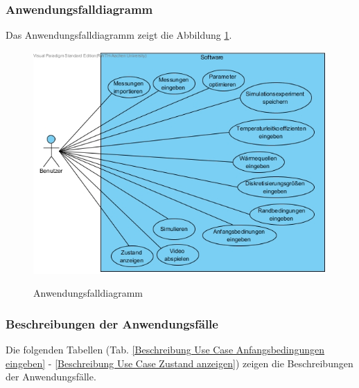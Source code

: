 \subsubsection{Anwendungsfalldiagramm}
Das Anwendungsfalldiagramm zeigt die Abbildung \ref{Use Case Diagramm}.
\begin{figure}[H]
	\centering
	\includegraphics[scale=.6]{Bilder/Use_Case_Diagramm.jpg}\\
	\caption{Anwendungsfalldiagramm}
	\label{Use Case Diagramm}
\end{figure}

\subsubsection{Beschreibungen der Anwendungsfälle}
Die folgenden Tabellen (Tab. \ref{Beschreibung Use Case Anfangsbedingungen eingeben} - \ref{Beschreibung Use Case Zustand anzeigen}) zeigen die Beschreibungen der Anwendungsfälle.

